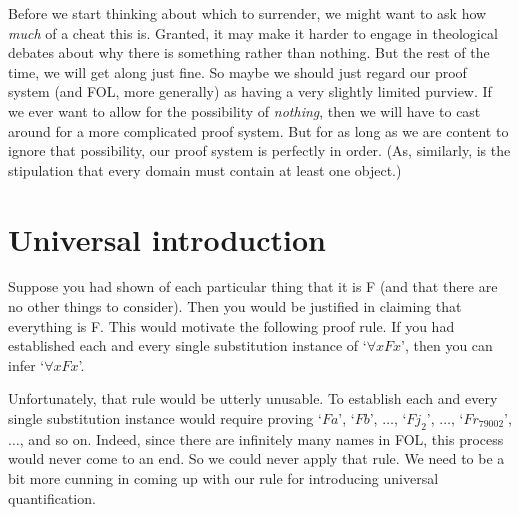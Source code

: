 Before we start thinking about which to surrender, we might want to ask how \emph{much} of a cheat this is. Granted, it may make it harder to engage in theological debates about why there is something rather than nothing. But the rest of the time, we will get along just fine. So maybe we should just regard our proof system (and FOL, more generally) as having a very slightly limited purview. If we ever want to allow for the possibility of \emph{nothing}, then we will have to cast around for a more complicated proof system. But for as long as we are content to ignore that possibility, our proof system is perfectly in order. (As, similarly, is the stipulation that every domain must contain at least one object.)


\section{Universal introduction}
Suppose you had shown of each particular thing that it is F (and that there are no other things to consider). Then you would be justified in claiming that everything is F. This would motivate the following proof rule. If you had established each and every single substitution instance of `$\forall x Fx$', then you can infer `$\forall x Fx$'.

Unfortunately, that rule would be utterly unusable. To establish each and every single substitution instance would require proving `$Fa$', `$Fb$', $\ldots$, `$Fj_2$', $\ldots$, `$Fr_{79002}$', $\ldots$, and so on. Indeed, since there are infinitely many names in FOL, this process would never come to an end. So we could never apply that rule. We need to be a bit more cunning in coming up with our rule for introducing universal quantification.

